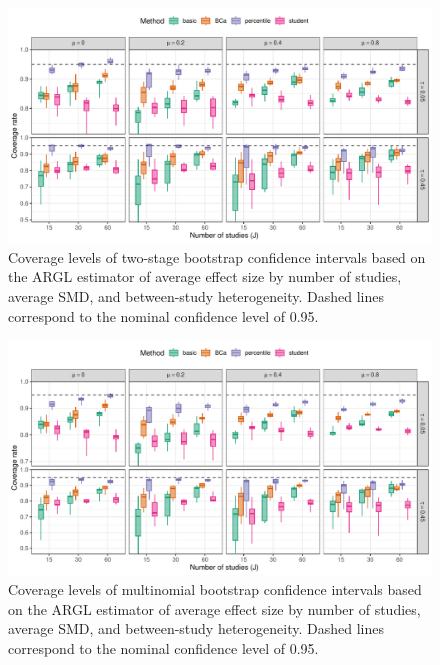 \documentclass[
  american,
  man, donotrepeattitle,mask,floatsintext]{apa7}
\numberwithin{table}{section}
\numberwithin{equation}{section}
\numberwithin{figure}{section}
\begin{document}
\begin{figure}
\includegraphics{step-function-selection-models-supplementary-materials_files/figure-latex/ARGL-coverage-two-stage-1} \caption{Coverage levels of two-stage bootstrap confidence intervals based on the ARGL estimator of average effect size by number of studies, average SMD, and between-study heterogeneity. Dashed lines correspond to the nominal confidence level of 0.95.}\label{fig:ARGL-coverage-two-stage}
\end{figure}

\begin{figure}
\includegraphics{step-function-selection-models-supplementary-materials_files/figure-latex/ARGL-coverage-multinomial-1} \caption{Coverage levels of multinomial bootstrap confidence intervals based on the ARGL estimator of average effect size by number of studies, average SMD, and between-study heterogeneity. Dashed lines correspond to the nominal confidence level of 0.95.}\label{fig:ARGL-coverage-multinomial}
\end{figure}
\end{document}
